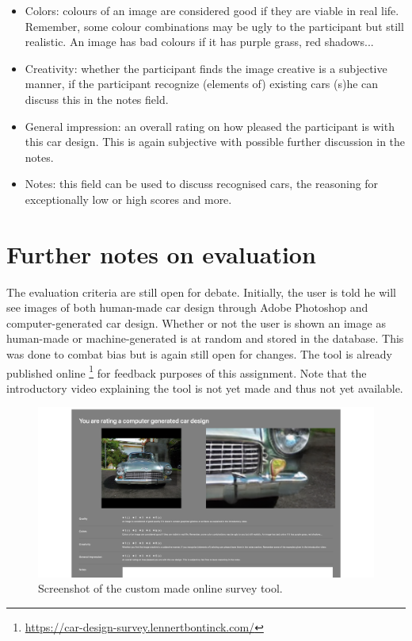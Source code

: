 \begin{itemize}
\begin{itemize}
        \item Colors: colours of an image are considered good if they are viable in real life. Remember, some colour combinations may be ugly to the participant but still realistic. An image has bad colours if it has purple grass, red shadows...
        \item Creativity: whether the participant finds the image creative is a subjective manner, if the participant recognize (elements of) existing cars (s)he can discuss this in the notes field.
        \item General impression: an overall rating on how pleased the participant is with this car design. This is again subjective with possible further discussion in the notes.
        \item Notes: this field can be used to discuss recognised cars, the reasoning for exceptionally low or high scores and more.
    \end{itemize}
\end{itemize}

\section{Further notes on evaluation}
\label{sec:notes_evaluation}

The evaluation criteria are still open for debate.
Initially, the user is told he will see images of both human-made car design through Adobe Photoshop and computer-generated car design.
Whether or not the user is shown an image as human-made or machine-generated is at random and stored in the database.
This was done to combat bias but is again still open for changes.
The tool is already published online \footnote{\url{https://car-design-survey.lennertbontinck.com/}} for feedback purposes of this assignment. 
Note that the introductory video explaining the tool is not yet made and thus not yet available. 

\begin{figure}[H]
    \centering
    \includegraphics[width=0.85\linewidth]{images/online_survey.png}
    \captionsetup{width=0.85\linewidth}
    \captionsetup{justification=centering}
    \caption{Screenshot of the custom made online survey tool.}
    \label{fig:eval_tool}
\end{figure}